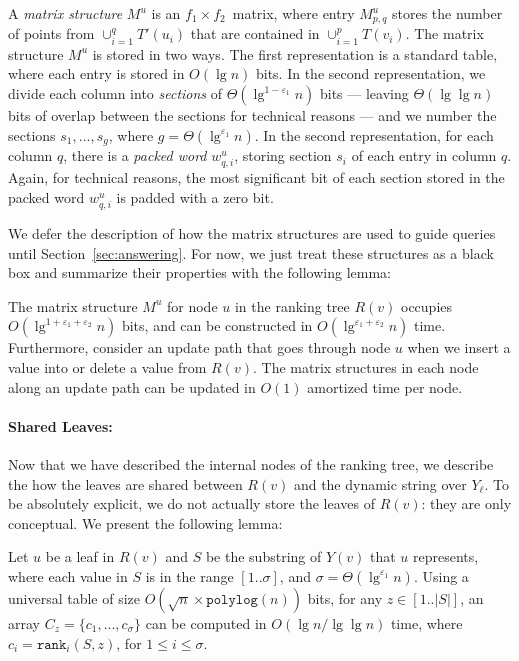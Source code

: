 \documentclass{llncs}
\def\idtt#1{\ensuremath{\mathtt{#1}}}
\def\rankop{\idtt{rank}}
\def\polylog{\idtt{polylog}}
\begin{document}
\begin{definition}
  A \emph{matrix structure} $M^u$ is an $f_1 \times f_2$~matrix, where
  entry $M^u_{p,q}$ stores the number of points from $\cup_{i=1}^{q}
  T'(u_i)$ that are contained in $\cup_{i = 1}^{p} T(v_i)$.  The
  matrix structure $M^u$ is stored in two ways.  The first
  representation is a standard table, where each entry is stored in
  $O(\lg n)$ bits.  In the second representation, we divide each
  column into \emph{sections} of $\Theta(\lg^{1-\varepsilon_1}n)$ bits
  --- leaving $\Theta(\lg \lg n)$ bits of overlap between the sections
  for technical reasons --- and we number the sections $s_1, ...,
  s_g$, where $g = \Theta(\lg^{\varepsilon_1} n)$.  In the second
  representation, for each column $q$, there is a \emph{packed word}
  $w^u_{q,i}$, storing section $s_i$ of each entry in column $q$.
  Again, for technical reasons, the most significant bit of each
  section stored in the packed word $w^u_{q,i}$ is padded with a zero
  bit.
\end{definition}

We defer the description of how the matrix structures are used to
guide queries until Section~\ref{sec:answering}.  For now, we just
treat these structures as a black box and summarize their properties
with the following lemma:

\begin{lemma}\label{lem:matrix-struct}
  The matrix structure $M^u$ for node $u$ in the ranking tree $R(v)$
  occupies $O(\lg^{1+\varepsilon_1+\varepsilon_2} n)$ bits, and can be
  constructed in $O(\lg^{\varepsilon_1+\varepsilon_2}n)$ time.
  Furthermore, consider an update path that goes through node $u$ when
  we insert a value into or delete a value from $R(v)$.  The matrix
  structures in each node along an update path can be updated in
  $O(1)$ amortized time per node.
\end{lemma}


\paragraph{Shared Leaves:}

Now that we have described the internal nodes of the ranking tree, we
describe the how the leaves are shared between $R(v)$ and the dynamic
string over $Y_\ell$.  To be absolutely explicit, we do not actually
store the leaves of $R(v)$: they are only conceptual. We present the
following lemma:

\begin{lemma}
\label{lem:leaf-query}
Let $u$ be a leaf in $R(v)$ and $S$ be the substring of $Y(v)$ that
$u$ represents, where each value in $S$ is in the range $[1..\sigma]$,
and $\sigma = \Theta(\lg^{\varepsilon_1}n)$.  Using a universal table
of size $O(\sqrt{n}\times \polylog(n))$ bits, for any $z \in
[1..|S|]$, an array $C_z = \{c_1, ..., c_\sigma \}$ can be computed in
$O(\lg n / \lg \lg n)$ time, where $c_i = \rankop_i(S,z)$, for $1 \le
i \le \sigma$.
\end{lemma}
\end{document}
